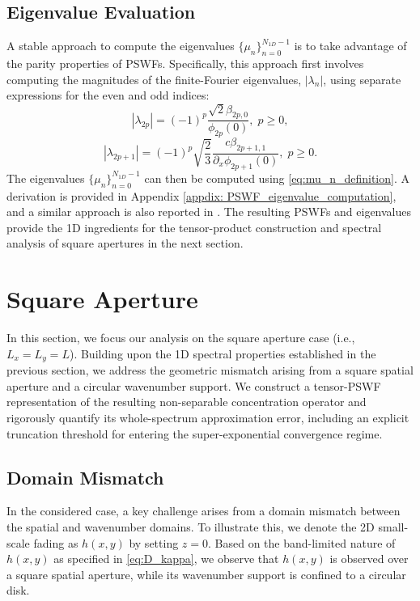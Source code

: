 \documentclass[lettersize,journal]{IEEEtran}
\theoremstyle{plain}
\begin{document}
\subsection{Eigenvalue Evaluation}
A stable approach to compute the eigenvalues $\{\mu_n\}_{n=0}^{N_{1D}-1}$ is to take advantage of the parity properties of PSWFs. 
Specifically, this approach first involves computing the magnitudes of the finite-Fourier eigenvalues, $|\lambda_n|$, using separate expressions for the even and odd indices:
\begin{equation}
	|\lambda_{2p}| = (-1)^p \frac{\sqrt{2}\beta_{2p, 0}}{\phi_{2p}(0)}, \; p \geq 0,
	\label{eq:lambda_computation_even}
\end{equation}
\begin{equation}
	|\lambda_{2p+1}| = (-1)^p \sqrt{\frac{2}{3}}\frac{c\beta_{2p+1, 1}}{\partial_{x} \phi_{2p+1}(0)}, \; p\geq 0.
	\label{eq:lambda_computation_odd}
\end{equation}
The eigenvalues $\{\mu_n\}_{n=0}^{N_{1D}-1}$ can then be computed using \eqref{eq:mu_n_definition}.
A derivation is provided in Appendix \ref{appdix: PSWF_eigenvalue_computation}, and a similar approach is also reported in \cite{wang2017review}. 
The resulting PSWFs and eigenvalues provide the 1D ingredients for the tensor-product construction and spectral analysis of square apertures in the next section.
	
\section{Square Aperture}
\label{sec:two dimensional case}

In this section, we focus our analysis on the square aperture case (i.e., $L_x = L_y = L$). Building upon the 1D spectral properties established in the previous section, we address the geometric mismatch arising from a square spatial aperture and a circular wavenumber support. 
We construct a tensor-PSWF representation of the resulting non-separable concentration operator and rigorously quantify its whole-spectrum approximation error, including an explicit truncation threshold for entering the super-exponential convergence regime.
	
\subsection{Domain Mismatch}
\label{subsec:Domain_mismatch}
In the considered case, a key challenge arises from a domain mismatch between the spatial and wavenumber domains. To illustrate this, we denote the 2D small-scale fading as $h(x, y)$ by setting $z = 0$. Based on the band-limited nature of $h(x, y)$ as specified in \eqref{eq:D_kappa}, we observe that $h(x, y)$ is observed over a square spatial aperture, while its wavenumber support is confined to a circular disk.
\end{document}
